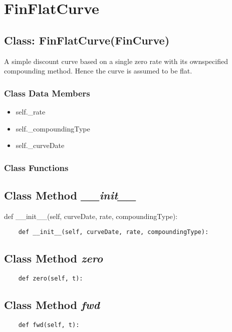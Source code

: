 \documentclass[twoside,11pt]{book}
\begin{document}
\newpage
\section{FinFlatCurve}

\subsection{Class: FinFlatCurve(FinCurve)}
A simple discount curve based on a single zero rate with its ownspecified compounding method. Hence the curve is assumed to be flat. 

\subsubsection{Class Data Members}
\begin{itemize}
\item{self.\_rate}
\item{self.\_compoundingType}
\item{self.\_curveDate}
\end{itemize}

\subsubsection{Class Functions}

\subsection{Class Method {\it \_\_init\_\_}}
def \_\_init\_\_(self, curveDate, rate, compoundingType):

\begin{lstlisting}
    def __init__(self, curveDate, rate, compoundingType):
\end{lstlisting}

\subsection{Class Method {\it zero}}


\begin{lstlisting}
    def zero(self, t):
\end{lstlisting}

\subsection{Class Method {\it fwd}}


\begin{lstlisting}
    def fwd(self, t):
\end{lstlisting}
\end{document}
